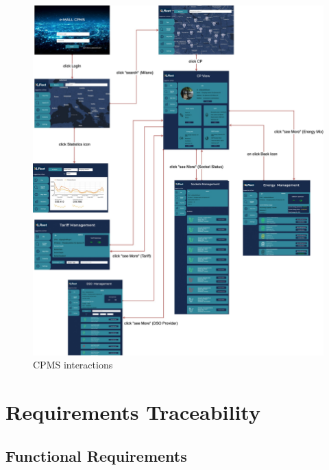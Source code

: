 \documentclass{Configuration_Files/PoliMi3i_thesis}
\begin{document}
\begin{figure}[H]
    \centering
    \includegraphics[width=1\textwidth]{Images/user-interface/cpms/CPMS-interactions.jpg}
    \caption{CPMS interactions}
\end{figure}

\chapter{Requirements Traceability}

\section{Functional Requirements}
\end{document}
